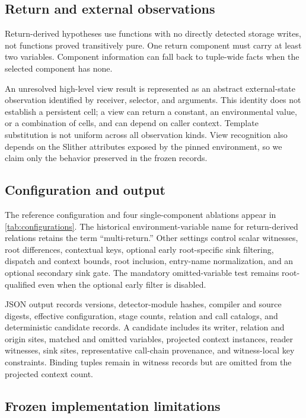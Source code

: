 \subsection{Return and external observations}

Return-derived hypotheses use functions with no directly detected storage writes, not functions proved transitively pure. One return component must carry at least two variables. Component information can fall back to tuple-wide facts when the selected component has none.

An unresolved high-level view result is represented as an abstract external-state observation identified by receiver, selector, and arguments. This identity does not establish a persistent cell; a view can return a constant, an environmental value, or a combination of cells, and can depend on caller context. Template substitution is not uniform across all observation kinds. View recognition also depends on the Slither attributes exposed by the pinned environment, so we claim only the behavior preserved in the frozen records.

\subsection{Configuration and output}

The reference configuration and four single-component ablations appear in \autoref{tab:configurations}. The historical environment-variable name for return-derived relations retains the term ``multi-return.'' Other settings control scalar witnesses, root differences, contextual keys, optional early root-specific sink filtering, dispatch and context bounds, root inclusion, entry-name normalization, and an optional secondary sink gate. The mandatory omitted-variable test remains root-qualified even when the optional early filter is disabled.

JSON output records versions, detector-module hashes, compiler and source digests, effective configuration, stage counts, relation and call catalogs, and deterministic candidate records. A candidate includes its writer, relation and origin sites, matched and omitted variables, projected context instances, reader witnesses, sink sites, representative call-chain provenance, and witness-local key constraints. Binding tuples remain in witness records but are omitted from the projected context count.

\subsection{Frozen implementation limitations}

